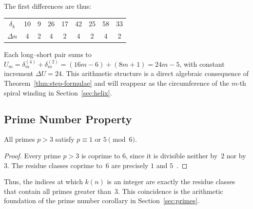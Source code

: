 The first differences are thus:
\begin{center}
\begin{tabular}{c*{8}{c}}
\toprule
$\delta_k$ & 10 & 9 & 26 & 17 & 42 & 25 & 58 & 33 \\
$\Delta n$ & 4 & 2 & 4 & 2 & 4 & 2 & 4 & 2 \\
\bottomrule
\end{tabular}
\end{center}

\begin{remark}
Each long--short pair sums to
$U_m = \delta^{(4)}_m + \delta^{(2)}_m = (16m-6)+(8m+1) = 24m-5$,
with constant increment $\Delta U = 24$. This arithmetic structure is a
direct algebraic consequence of Theorem~\ref{thm:step-formulae} and will
reappear as the circumference of the $m$-th spiral winding in
Section~\ref{sec:helix}.
\end{remark}

\subsection{Prime Number Property}\label{subsec:primes-mod6}

\begin{theorem}\label{thm:primes-mod6}
All primes $p > 3$ satisfy $p \equiv 1$ or $5 \pmod{6}$.
\end{theorem}

\begin{proof}
Every prime $p > 3$ is coprime to $6$, since it is divisible neither by~$2$
nor by~$3$. The residue classes coprime to~$6$ are precisely $1$ and
$5$~\cite[Ch.\,1]{IrelandRosen1990}.
\end{proof}

Thus, the indices at which $k(n)$ is an integer are exactly the residue
classes that contain all primes greater than~$3$. This coincidence is the arithmetic foundation of the prime number
corollary in Section~\ref{sec:primes}.
